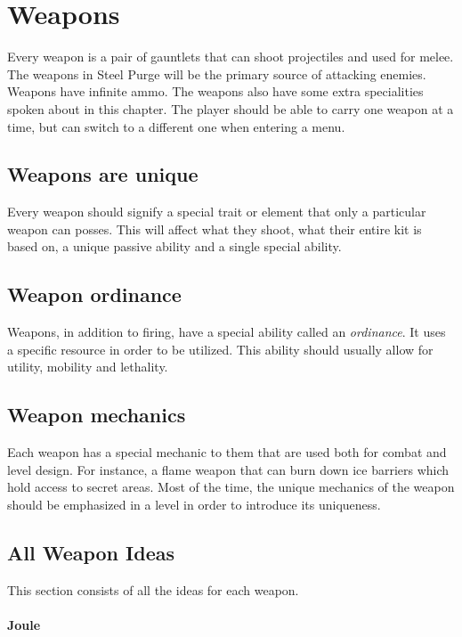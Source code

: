 \documentclass[../Main.tex]{subfiles}
\begin{document}
\section{Weapons}

Every weapon is a pair of gauntlets that can shoot projectiles and used for melee. The weapons in Steel Purge will be the primary source of attacking enemies. Weapons have infinite ammo. The weapons also have some extra specialities spoken about in this chapter. The player should be able to carry one weapon at a time, but can switch to a different one when entering a menu.

\subsection{Weapons are unique}

Every weapon should signify a special trait or element that only a particular weapon can posses. This will affect what they shoot, what their entire kit is based on, a unique passive ability and a single special ability. 

\subsection{Weapon ordinance}

Weapons, in addition to firing, have a special ability called an \emph{ordinance}. It uses a specific resource in order to be utilized. This ability should usually allow for utility, mobility and lethality.

\subsection{Weapon mechanics}

Each weapon has a special mechanic to them that are used both for combat and level design. For instance, a flame weapon that can burn down ice barriers which hold access to secret areas. Most of the time, the unique mechanics of the weapon should be emphasized in a level in order to introduce its uniqueness. 

\subsection{All Weapon Ideas}

This section consists of all the ideas for each weapon.

\paragraph{Joule}
\end{document}
